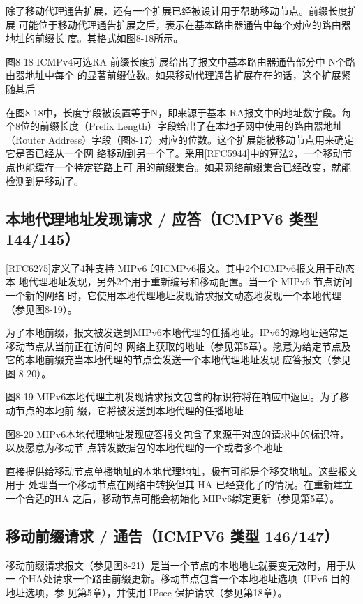 除了移动代理通告扩展，还有一个扩展已经被设计用于帮助移动节点。前缀长度扩展
可能位于移动代理通告扩展之后，表示在基本路由器通告中每个对应的路由器地址的前缀长
度。其格式如图8-18所示。

图8-18 ICMPv4可选RA 前缀长度扩展给出了报文中基本路由器通告部分中 N个路由器地址中每个
的显著前缀位数。如果移动代理通告扩展存在的话，这个扩展紧随其后

在图8-18中，长度字段被设置等于N，即来源于基本 RA报文中的地址数字段。每
个8位的前缀长度（Prefix Length）字段给出了在本地子网中使用的路由器地址（Router
Address）字段（图8-17）对应的位数。这个扩展能被移动节点用来确定它是否已经从一个网
络移动到另一个了。采用\href{https://www.rfc-editor.org/rfc/rfc5944}{[RFC5944]}中的算法2，一个移动节点也能缓存一个特定链路上可
用的前缀集合。如果网络前缀集合已经改变，就能检测到是移动了。

\subsection{本地代理地址发现请求 / 应答（ICMPV6 类型 144/145）}
\href{https://www.rfc-editor.org/rfc/rfc6275}{[RFC6275]}定义了4种支持 MIPv6
的ICMPv6报文。其中2个ICMPv6报文用于动态本
地代理地址发现，另外2个用于重新编号和移动配置。当一个 MIPv6 节点访问一个新的网络
时，它使用本地代理地址发现请求报文动态地发现一个本地代理（参见图8-19）。

为了本地前缀，报文被发送到MIPv6本地代理的任播地址。IPv6的源地址通常是移动节点从当前正在访问的
网络上获取的地址（参见第5章）。愿意为给定节点及它的本地前缀充当本地代理的节点会发送一个本地代理地址发现
应答报文（参见图 8-20）。

图8-19 MIPv6本地代理主机发现请求报文包含的标识符将在响应中返回。为了移动节点的本地前
缀，它将被发送到本地代理的任播地址

图8-20 MIPv6本地代理地址发现应答报文包含了来源于对应的请求中的标识符，以及愿意为移动节
点转发数据包的本地代理的一个或者多个地址

直接提供给移动节点单播地址的本地代理地址，极有可能是个移交地址。这些报文用于
处理当一个移动节点在网络中转换但其 HA 已经变化了的情况。在重新建立一个合适的HA
之后，移动节点可能会初始化 MIPv6绑定更新（参见第5章）。

\subsection{移动前缀请求 / 通告（ICMPV6 类型 146/147）}
移动前缀请求报文（参见图8-21）是当一个节点的本地地址就要变无效时，用于从一
个HA处请求一个路由前缀更新。移动节点包含一个本地地址选项（IPv6 目的地址选项，参
见第5章），并使用 IPsec 保护请求（参见第18章）。

